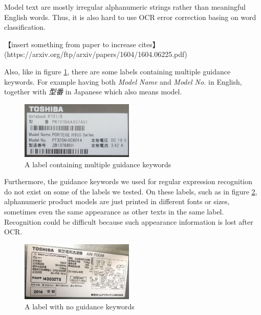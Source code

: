 \documentclass[technicalreport]{ieicej}
\begin{document}
        Model text are mostly irregular alphanumeric strings rather than meaningful English words. Thus, it is also hard to use OCR error correction basing on word classification.
        
        \vspace*{\baselineskip}

        【insert something from paper to increase cites】\\
        (https://arxiv.org/ftp/arxiv/papers/1604/1604.06225.pdf)

        \vspace*{\baselineskip}
        
        Also, like in figure \ref{fig:3models}, there are some labels containing multiple guidance keywords. For example having both {\em Model Name} and {\em Model No.} in English, together with {\em 型番} in Japanese which also means model.

        \begin{figure}[t] 
            \begin{center}
            \includegraphics[width=0.48\textwidth]{figure/3models.png}
            \end{center}
            \caption{A label containing multiple guidance keywords}
            \label{fig:3models}
        \end{figure}

        Furthermore, the guidance keywords we used for regular expression recognition do not exist on some of the labels we tested. On these labels, such as in figure \ref{fig:no-guidance.png}, alphanumeric product models are just printed in different fonts or sizes, sometimes even the same appearance as other texts in the same label. Recognition could be difficult because such appearance information is lost after OCR.
        
        \begin{figure}[t] 
            \begin{center}
            \includegraphics[width=0.48\textwidth]{figure/no-guidance.png}
            \end{center}
            \caption{A label with no guidance keywords}
            \label{fig:no-guidance.png}
        \end{figure}
\end{document}
